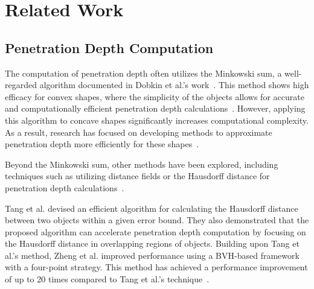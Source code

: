 \section{Related Work}

\subsection{Penetration Depth Computation}

The computation of penetration depth often utilizes the Minkowski sum, a well-regarded algorithm documented in Dobkin et al.'s work~\cite{dobkin1993computing}.
This method shows high efficacy for convex shapes, where the simplicity of the objects allows for accurate and computationally efficient penetration depth calculations~\cite{dobkin1993computing,varadhan2004accurate,hachenberger2009exact}.
However, applying this algorithm to concave shapes significantly increases computational complexity.  
As a result, research has focused on developing methods to approximate penetration depth more efficiently for these shapes~\cite{cameron1997enhancing,bergen1999fast,lien2010simple,je2012polydepth}.  

Beyond the Minkowski sum, other methods have been explored, including techniques such as utilizing distance fields or the Hausdorff distance for penetration depth calculations~\cite{fisher2001fast,sud2006fast,SIG09HIST}.

Tang et al.\cite{SIG09HIST} devised an efficient algorithm for calculating the Hausdorff distance between two objects within a given error bound.
They also demonstrated that the proposed algorithm can accelerate penetration depth computation by focusing on the Hausdorff distance in overlapping regions of objects.
Building upon Tang et al.'s method, Zheng et al.\cite{zheng2022economic} improved performance using a BVH-based framework with a four-point strategy.
This method has achieved a performance improvement of up to 20 times compared to Tang et al.'s technique~\cite{SIG09HIST}.



